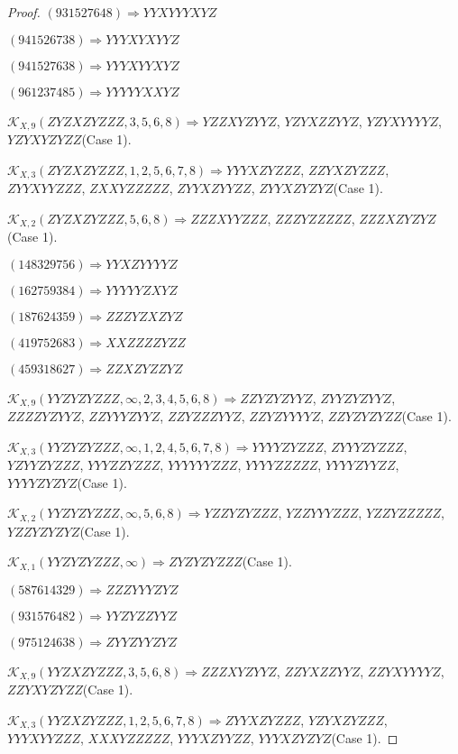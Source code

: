 \documentclass[12pt]{article}
\theoremstyle{plain}
\theoremstyle{definition}
\theoremstyle{remark}
\newcommand{\fancy}[1]{\mathcal{#1}}
\def\K{\fancy{K}}
\begin{document}
\begin{proof}
	$(9 3 1 5 2 7 6 4 8)\Rightarrow YYXYYYXYZ$
	
	$(9 4 1 5 2 6 7 3 8)\Rightarrow YYYXYXYYZ$
	
	$(9 4 1 5 2 7 6 3 8)\Rightarrow YYYXYYXYZ$
	
	$(9 6 1 2 3 7 4 8 5)\Rightarrow YYYYYXXYZ$
	
	
	
	$\K_{X,9}(ZYZXZYZZZ,3, 5, 6, 8)\Rightarrow $$YZZXYZYYZ$, $YZYXZZYYZ$, $YZYXYYYYZ$, $YZYXYZYZZ$(Case 1).
	
	$\K_{X,3}(ZYZXZYZZZ,1, 2, 5, 6, 7, 8)\Rightarrow $$YYYXZYZZZ$, $ZZYXZYZZZ$, $ZYYXYYZZZ$, $ZXXYZZZZZ$, $ZYYXZYYZZ$, $ZYYXZYZYZ$(Case 1).
	
	$\K_{X,2}(ZYZXZYZZZ,5, 6, 8)\Rightarrow $$ZZZXYYZZZ$, $ZZZYZZZZZ$, $ZZZXZYZYZ$(Case 1).
	
	
	
	$(1 4 8 3 2 9 7 5 6)\Rightarrow YYXZYYYYZ$
	
	$(1 6 2 7 5 9 3 8 4)\Rightarrow YYYYYZXYZ$
	
	$(1 8 7 6 2 4 3 5 9)\Rightarrow ZZZYZXZYZ$
	
	$(4 1 9 7 5 2 6 8 3)\Rightarrow XXZZZZYZZ$
	
	$(4 5 9 3 1 8 6 2 7)\Rightarrow ZZXZYZZYZ$
	
	
	
	$\K_{X,9}(YYZYZYZZZ,\infty,2, 3, 4, 5, 6, 8)\Rightarrow $$ZZYZYZYYZ$, $ZYYZYZYYZ$, $ZZZZYZYYZ$, $ZZYYYZYYZ$, $ZZYZZZYYZ$, $ZZYZYYYYZ$, $ZZYZYZYZZ$(Case 1).
	
	$\K_{X,3}(YYZYZYZZZ,\infty,1, 2, 4, 5, 6, 7, 8)\Rightarrow $$YYYYZYZZZ$, $ZYYYZYZZZ$, $YZYYZYZZZ$, $YYYZZYZZZ$, $YYYYYYZZZ$, $YYYYZZZZZ$, $YYYYZYYZZ$, $YYYYZYZYZ$(Case 1).
	
	$\K_{X,2}(YYZYZYZZZ,\infty,5, 6, 8)\Rightarrow $$YZZYZYZZZ$, $YZZYYYZZZ$, $YZZYZZZZZ$, $YZZYZYZYZ$(Case 1).
	
	$\K_{X,1}(YYZYZYZZZ,\infty)\Rightarrow $$ZYZYZYZZZ$(Case 1).
	
	
	
	$(5 8 7 6 1 4 3 2 9)\Rightarrow ZZZYYYZYZ$
	
	$(9 3 1 5 7 6 4 8 2)\Rightarrow YYZYZZYYZ$
	
	$(9 7 5 1 2 4 6 3 8)\Rightarrow ZYYZYYZYZ$
	
	
	
	$\K_{X,9}(YYZXZYZZZ,3, 5, 6, 8)\Rightarrow $$ZZZXYZYYZ$, $ZZYXZZYYZ$, $ZZYXYYYYZ$, $ZZYXYZYZZ$(Case 1).
	
	$\K_{X,3}(YYZXZYZZZ,1, 2, 5, 6, 7, 8)\Rightarrow $$ZYYXZYZZZ$, $YZYXZYZZZ$, $YYYXYYZZZ$, $XXXYZZZZZ$, $YYYXZYYZZ$, $YYYXZYZYZ$(Case 1).
	

\end{proof}
\end{document}
